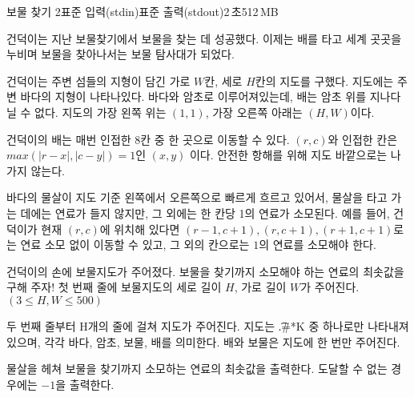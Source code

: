 \begin{problem}{보물 찾기 2}{표준 입력(stdin)}{표준 출력(stdout)}{2\,초}{512\,MB}

건덕이는 지난 보물찾기에서 보물을 찾는 데 성공했다. 이제는 배를 타고 세계 곳곳을 누비며 보물을 찾아나서는 보물 탐사대가 되었다.

건덕이는 주변 섬들의 지형이 담긴 가로 $W$칸, 세로 $H$칸의 지도를 구했다. 지도에는 주변 바다의 지형이 나타나있다. 바다와 암초로 이루어져있는데, 배는 암초 위를 지나다닐 수 없다. 지도의 가장 왼쪽 위는 $(1, 1)$, 가장 오른쪽 아래는 $(H, W)$이다.

건덕이의 배는 매번 인접한 8칸 중 한 곳으로 이동할 수 있다. $(r,c)$와 인접한 칸은 $max(|r-x|, |c-y|) = 1$인 $(x, y)$ 이다. 안전한 항해를 위해 지도 바깥으로는 나가지 않는다.

바다의 물살이 지도 기준 왼쪽에서 오른쪽으로 빠르게 흐르고 있어서, 물살을 타고 가는 데에는 연료가 들지 않지만, 그 외에는 한 칸당 1의 연료가 소모된다.
예를 들어, 건덕이가 현재 $(r, c)$에 위치해 있다면 $(r-1, c+1), (r, c+1), (r+1, c+1)$로는 연료 소모 없이 이동할 수 있고, 그 외의 칸으로는 $1$의 연료를 소모해야 한다.

건덕이의 손에 보물지도가 주어졌다. 보물을 찾기까지 소모해야 하는 연료의 최솟값을 구해 주자!
\InputFile
첫 번째 줄에 보물지도의 세로 길이 $H$, 가로 길이 $W$가 주어진다. $(3 \le H, W \le 500)$

두 번째 줄부터 H개의 줄에 걸쳐 지도가 주어진다. 지도는 \t{.\#*K} 중 하나로만 나타내져 있으며, 각각 바다, 암초, 보물, 배를 의미한다. 배와 보물은 지도에 한 번만 주어진다.

\OutputFile
물살을 헤쳐 보물을 찾기까지 소모하는 연료의 최솟값을 출력한다. 도달할 수 없는 경우에는 $-1$을 출력한다.

\Examples

\begin{example}
%
%
%
\end{example}

\end{problem}
